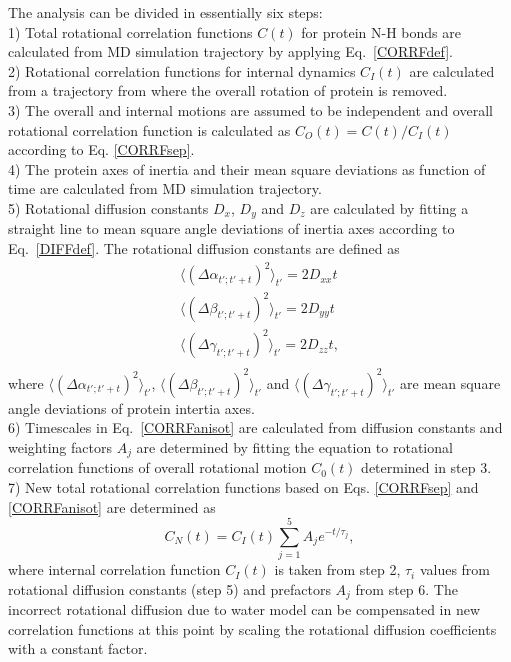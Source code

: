 \documentclass[pre,aps,floatfix,authordate1-4,twocolumn]{revtex4-1}
\begin{document}
The analysis can be divided in essentially six steps: \\
1) Total rotational correlation functions $C(t)$
for protein N-H bonds are calculated from MD simulation trajectory
by applying Eq.~\ref{CORRFdef}. \\
2) Rotational correlation functions for internal
dynamics $C_I(t)$ are calculated from a trajectory from where the overall
rotation of protein is removed. \\
3) The overall and internal motions are assumed to be independent and overall
rotational correlation function is calculated as $C_O(t)=C(t)/C_I(t)$ according to Eq. \ref{CORRFsep}. \\
4) The protein axes of inertia and their mean square deviations as function of
time are calculated from MD simulation trajectory. \\
5) Rotational diffusion constants $D_x$, $D_y$ and $D_z$ are calculated by fitting a straight line
to mean square angle deviations of inertia axes according to Eq.~\ref{DIFFdef}. 
The rotational diffusion constants are defined as 
\begin{equation}\label{DIFFdef}
  \begin{aligned}
    \langle (\Delta \alpha_{t';t'+t})^2 \rangle_{t'} = 2 D_{xx} t \\
    \langle (\Delta \beta_{t';t'+t})^2 \rangle_{t'} = 2 D_{yy} t \\
    \langle (\Delta \gamma_{t';t'+t})^2 \rangle_{t'} = 2 D_{zz} t, \\
  \end{aligned}
\end{equation}
where $\langle (\Delta \alpha_{t';t'+t})^2 \rangle_{t'}$,
$\langle (\Delta \beta_{t';t'+t})^2 \rangle_{t'}$ and
$\langle (\Delta \gamma_{t';t'+t})^2 \rangle_{t'}$ are mean
square angle deviations of protein intertia axes.\\
6) Timescales in Eq.~\ref{CORRFanisot} are calculated from diffusion constants and
weighting factors $A_j$ are determined by fitting the equation to
rotational correlation functions of overall rotational motion $C_0(t)$ determined in step 3. \\
7) New total rotational correlation functions based on Eqs. \ref{CORRFsep} and \ref{CORRFanisot}
are determined as
\begin{equation}\label{newCORRF}
  C_N(t)=C_I(t)\sum_{j=1}^5 A_j e^{-t/\tau_j},
\end{equation}
where internal correlation function $C_I(t)$ is taken from step 2,
$\tau_i$ values from rotational diffusion constants (step 5) and
prefactors $A_j$ from step 6. The incorrect rotational
diffusion due to water model can be compensated in new correlation
functions at this point
 by scaling the rotational diffusion coefficients with a constant factor.
\end{document}
